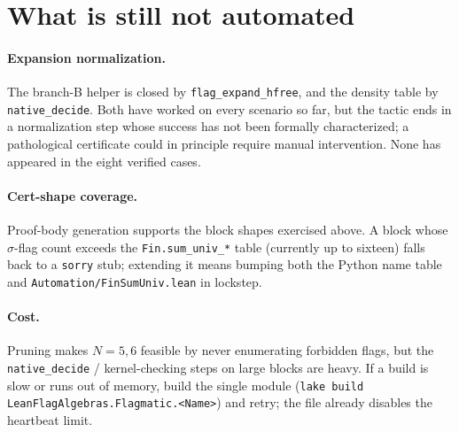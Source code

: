 \documentclass[11pt]{article}
\begin{document}
\section{What is still not automated}

\paragraph{Expansion normalization.}
The branch-B helper is closed by \texttt{flag\_expand\_hfree}, and the density
table by \texttt{native\_decide}. Both have worked on every scenario so far, but
the tactic ends in a normalization step whose success has not been formally
characterized; a pathological certificate could in principle require manual
intervention. None has appeared in the eight verified cases.

\paragraph{Cert-shape coverage.}
Proof-body generation supports the block shapes exercised above. A block whose
$\sigma$-flag count exceeds the \texttt{Fin.sum\_univ\_*} table (currently up to
sixteen) falls back to a \texttt{sorry} stub; extending it means bumping both the
Python name table and \texttt{Automation/FinSumUniv.lean} in lockstep.

\paragraph{Cost.}
Pruning makes $N=5,6$ feasible by never enumerating forbidden flags, but the
\texttt{native\_decide} / kernel-checking steps on large blocks are heavy. If a
build is slow or runs out of memory, build the single module
(\texttt{lake build LeanFlagAlgebras.Flagmatic.<Name>}) and retry; the file
already disables the heartbeat limit.
\end{document}

